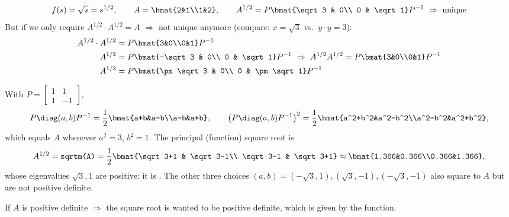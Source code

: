 \begin{example}
\[
f(s) = \sqrt{s} = s^{1/2},
\qquad
A = \bmat{2&1\\1&2},
\qquad
A^{1/2} = P\bmat{\sqrt3 & 0\\ 0 & \sqrt1}P^{-1} \ \Rightarrow\ \text{unique}
\]
But if we only require $A^{1/2}\cdot A^{1/2} = A$ $\Rightarrow$ not unique anymore (compare: $x = \sqrt3$ vs.\ $y\cdot y = 3$):
\begin{align*}
A^{1/2}\cdot A^{1/2} &= P\bmat{3&0\\0&1}P^{-1}\\
A^{1/2} &= P\bmat{-\sqrt3 & 0\\ 0 & \sqrt1}P^{-1} \ \Rightarrow\ A^{1/2}A^{1/2} = P\bmat{3&0\\0&1}P^{-1}\\
A^{1/2} &= P\bmat{\pm\sqrt3 & 0\\ 0 & \pm\sqrt1}P^{-1}
\end{align*}
\begin{insight}
With $P=\left[\begin{smallmatrix}1&1\\1&-1\end{smallmatrix}\right]$,
\[
P\diag(a,b)P^{-1}=\frac12\bmat{a+b&a-b\\a-b&a+b},
\qquad
\bigl(P\diag(a,b)P^{-1}\bigr)^2=\frac12\bmat{a^2+b^2&a^2-b^2\\a^2-b^2&a^2+b^2},
\]
which equals $A$ whenever $a^2=3$, $b^2=1$. The principal (function) square root is
\[
A^{1/2} = \text{\texttt{sqrtm(A)}} =\frac12\bmat{\sqrt3+1 & \sqrt3-1\\ \sqrt3-1 & \sqrt3+1}\approx\bmat{1.366&0.366\\0.366&1.366},
\]
whose eigenvalues $\sqrt3,1$ are positive: it is . The other three choices $(a,b)=(-\sqrt3,1),(\sqrt3,-1),(-\sqrt3,-1)$ also square to $A$ but are not positive definite.
\end{insight}
If $A$ is positive definite $\Rightarrow$ the square root is wanted to be positive definite, which is given by the function.
\end{example}
